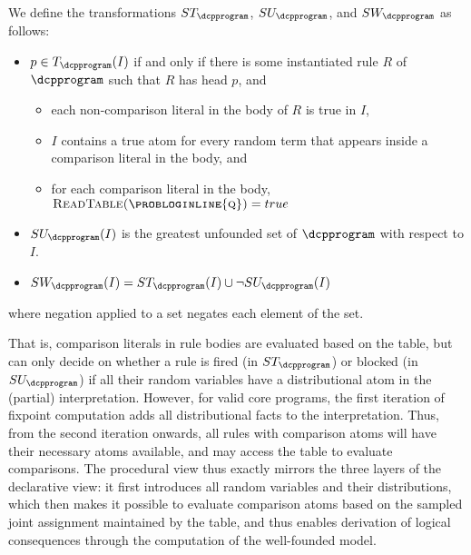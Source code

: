 \begin{definition}\label{def:swp}
	We define the transformations $ST_\dcpprogram$, $SU_\dcpprogram$, and $SW_\dcpprogram$ as follows:
	\begin{itemize}
		\item $p\in T_\dcpprogram(I)$ if and only if there is some instantiated rule $R$ of $\dcpprogram$ such that $R$ has head $p$, and
		\begin{itemize}
			\item each non-comparison  literal in the body of $R$ is true in $I$,
			\item $I$ contains a true atom  for every random term  that appears inside a comparison literal in the body, and 
			\item for each comparison literal  in the body, $\textsc{ReadTable(\probloginline{q})}=true$
		\end{itemize}
		\item $SU_\dcpprogram(I)$ is the greatest unfounded set of $\dcpprogram$ with respect to $I$.
		\item $SW_\dcpprogram(I) = ST_\dcpprogram(I) \cup \neg SU_\dcpprogram(I)$
	\end{itemize}
	where negation applied to a set negates each element of the set.
\end{definition}
That is, comparison literals in rule bodies are evaluated based on the table, but can only decide on whether a rule is fired (in $ST_\dcpprogram$) or blocked (in $SU_\dcpprogram$) if all their random variables have a distributional atom in the (partial) interpretation.
However, for valid core \dcproblogsty programs, the first iteration of fixpoint computation adds all distributional facts to the interpretation. Thus, from the second iteration onwards, all rules with comparison atoms will have their necessary  atoms available, and may access the table to evaluate comparisons. The procedural view thus exactly mirrors the three layers of the declarative view: it first introduces all random variables and their distributions, which then makes it possible to evaluate comparison atoms based on the sampled joint assignment maintained by the table, and thus enables derivation of logical consequences through the computation of the well-founded model. 





